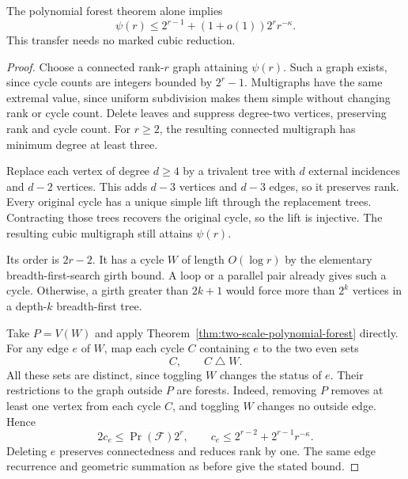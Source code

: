 \begin{proposition}
\label{prop:two-scale-direct-cycle-transfer}
The polynomial forest theorem alone implies
\[
 \psi(r)\le2^{r-1}+(1+o(1))2^r r^{-\kappa}.
\]
This transfer needs no marked cubic reduction.
\end{proposition}

\begin{proof}
Choose a connected rank-$r$ graph attaining $\psi(r)$.
Such a graph exists, since cycle counts are integers bounded by $2^r-1$.
Multigraphs have the same extremal value, since uniform subdivision makes them simple without changing rank or cycle count.
Delete leaves and suppress degree-two vertices, preserving rank and cycle count.
For $r\ge2$, the resulting connected multigraph has minimum degree at least three.

Replace each vertex of degree $d\ge4$ by a trivalent tree with $d$ external incidences and $d-2$ vertices.
This adds $d-3$ vertices and $d-3$ edges, so it preserves rank.
Every original cycle has a unique simple lift through the replacement trees.
Contracting those trees recovers the original cycle, so the lift is injective.
The resulting cubic multigraph still attains $\psi(r)$.

Its order is $2r-2$.
It has a cycle $W$ of length $O(\log r)$ by the elementary breadth-first-search girth bound.
A loop or a parallel pair already gives such a cycle.
Otherwise, a girth greater than $2k+1$ would force more than $2^k$ vertices in a depth-$k$ breadth-first tree.

Take $P=V(W)$ and apply Theorem~\ref{thm:two-scale-polynomial-forest} directly.
For any edge $e$ of $W$, map each cycle $C$ containing $e$ to the two even sets
\[
 C,\qquad C\mathbin\triangle W.
\]
All these sets are distinct, since toggling $W$ changes the status of $e$.
Their restrictions to the graph outside $P$ are forests.
Indeed, removing $P$ removes at least one vertex from each cycle $C$, and toggling $W$ changes no outside edge.
Hence
\[
 2c_e\le\Pr(\mathcal F)2^r,
 \qquad c_e\le2^{r-2}+2^{r-1}r^{-\kappa}.
\]
Deleting $e$ preserves connectedness and reduces rank by one.
The same edge recurrence and geometric summation as before give the stated bound.
\end{proof}
